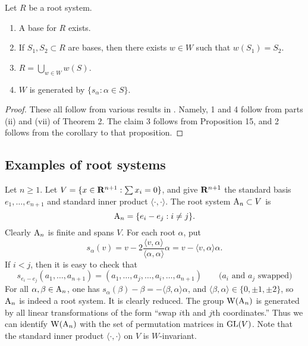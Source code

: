 \begin{theorem}
Let $R$ be a root system. 
\begin{enumerate}
\item A base for $R$ exists. 
\item If $S_1,S_2\subset R$ are bases, then there exists $w\in W$ such that 
$w(S_1)=S_2$. 
\item $R=\bigcup_{w\in W} w(S)$. 
\item $W$ is generated by $\{s_\alpha:\alpha\in S\}$. 
\end{enumerate}
\end{theorem}
\begin{proof}
These all follow from various results in 
\cite[VI \S 1.5]{bourbaki-lie-alg-4-6}. Namely, 1 and 4 follow from parts 
(ii) and (vii) of Theorem 2. The claim 3 follows from Proposition 15, and 2 
follows from the corollary to that proposition. 
\end{proof}





\subsection{Examples of root systems}

\begin{example}
Let $n\geqslant 1$. Let $V=\{x\in \mathbf{R}^{n+1}:\sum x_i=0\}$, and give $\mathbf{R}^{n+1}$ 
the standard basis $e_1,\dots,e_{n+1}$ and standard inner product 
$\langle\cdot,\cdot\rangle$. The root system $\mathrm{A}_n\subset V$ is 
\[
  \mathrm{A}_n=\{e_i-e_j:i\ne j\} .
\]
Clearly $\mathrm{A}_n$ is finite and spans $V$. For each root $\alpha$, put 
\[
  s_\alpha(v) = v-2\frac{\langle v,\alpha\rangle}{\langle \alpha,\alpha\rangle} \alpha  = v-\langle v,\alpha\rangle \alpha .
\]
If $i<j$, then it is easy to check that 
\[
  s_{e_i-e_j}(a_1,\dots,a_{n+1}) = (a_1,\dots,a_j,\dots,a_i,\dots,a_{n+1}) \qquad \text{($a_i$ and $a_j$ swapped)}
\]
For all $\alpha,\beta\in \mathrm{A}_n$, one has 
$s_\alpha(\beta)-\beta=-\langle \beta,\alpha\rangle\alpha$, and 
$\langle \beta,\alpha\rangle\in \{0,\pm 1,\pm 2\}$, so $\mathrm{A}_n$ is indeed 
a root system. It is clearly reduced. The group $\operatorname{W}(\mathrm{A}_n)$ is generated 
by all linear transformations of the form ``swap $i$th and $j$th coordinates.'' 
Thus we can identify $\operatorname{W}(\mathrm{A}_n)$ with the set of permutation matrices 
in $\operatorname{GL}(V)$. Note that the standard inner product $\langle\cdot,\cdot\rangle$ 
on $V$ is $W$-invariant. 
\end{example}

